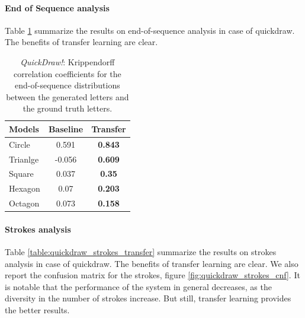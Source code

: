       \paragraph{End of Sequence analysis}
        Table \ref{table:quickdraw_eos_transfer} summarize the results on end-of-sequence analysis in case of quickdraw. The benefits of transfer learning are clear.
        \begin{table}[!htbp]
          \centering
          \begin{tabular}{l c c} \hline

          Models & Baseline & Transfer \\ \hline
          Circle &  0.591 & \textbf{0.843} \\ %
          Trianlge & -0.056 & \textbf{0.609} \\ %
          Square &  0.037 &  \textbf{0.35} \\ %
          Hexagon &  0.07 &  \textbf{0.203} \\ %
          Octagon &  0.073 &  \textbf{0.158} \\ \hline

          \end{tabular}
          \caption{\textit{QuickDraw!}: Krippendorff correlation coefficients for the end-of-sequence distributions between the generated letters and the ground truth letters.}
          \label{table:quickdraw_eos_transfer}
        \end{table}

      \paragraph{Strokes analysis}
        Table \ref{table:quickdraw_strokes_transfer} summarize the results on strokes analysis in case of quickdraw. The benefits of transfer learning are clear. We also report the confusion matrix for the strokes, figure \ref{fig:quickdraw_strokes_cnf}. It is notable that the performance of the system in general decreases, as the diversity in the number of strokes increase. But still, transfer learning provides the better results.

